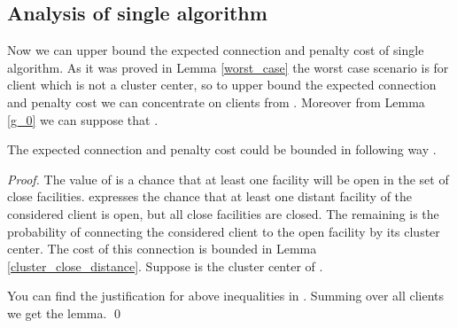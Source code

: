 \documentclass{llncs}
\begin{document}
\begin{appendix}
\section{Analysis of single algorithm}
\label{sec:single_algorithm}

Now we can upper bound the expected connection and penalty cost of single algorithm. As it was proved in Lemma \ref{worst_case} the worst case scenario is for client  which is not a cluster center, so to upper bound the expected connection and penalty cost we can concentrate on clients from . Moreover from Lemma \ref{g_0} we can suppose that .

\begin{lemma}
 The expected connection and penalty cost could be bounded in following way .
\end{lemma}

\begin{proof}
The value of  is a chance that at least one facility will be open in the set of close facilities. 
expresses the chance that at least one distant facility of the considered client is open, but all close facilities are closed. The remaining  is the probability of connecting the considered client to the open facility by its cluster center. The cost of this connection is bounded in Lemma \ref{cluster_close_distance}. Suppose  is the cluster center of .





You can find the justification for above inequalities in \cite{Ghodsi}. Summing over all clients we get the lemma.
\qed
\end{proof}
\end{appendix}
\end{document}
